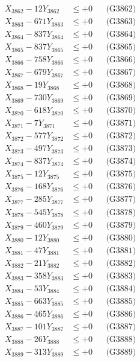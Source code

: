 \documentclass[a4paper,10pt]{article}
\begin{document}
{\begin{align}
X_{3862} - 12Y_{3862} &\leq +0 && \text{(G3862)} \\
X_{3863} - 671Y_{3863} &\leq +0 && \text{(G3863)} \\
X_{3864} - 837Y_{3864} &\leq +0 && \text{(G3864)} \\
X_{3865} - 837Y_{3865} &\leq +0 && \text{(G3865)} \\
X_{3866} - 758Y_{3866} &\leq +0 && \text{(G3866)} \\
X_{3867} - 679Y_{3867} &\leq +0 && \text{(G3867)} \\
X_{3868} - 19Y_{3868} &\leq +0 && \text{(G3868)} \\
X_{3869} - 730Y_{3869} &\leq +0 && \text{(G3869)} \\
X_{3870} - 618Y_{3870} &\leq +0 && \text{(G3870)} \\
\allowbreak
X_{3871} - 7Y_{3871} &\leq +0 && \text{(G3871)} \\
X_{3872} - 577Y_{3872} &\leq +0 && \text{(G3872)} \\
X_{3873} - 497Y_{3873} &\leq +0 && \text{(G3873)} \\
X_{3874} - 837Y_{3874} &\leq +0 && \text{(G3874)} \\
X_{3875} - 12Y_{3875} &\leq +0 && \text{(G3875)} \\
X_{3876} - 168Y_{3876} &\leq +0 && \text{(G3876)} \\
X_{3877} - 285Y_{3877} &\leq +0 && \text{(G3877)} \\
X_{3878} - 545Y_{3878} &\leq +0 && \text{(G3878)} \\
X_{3879} - 460Y_{3879} &\leq +0 && \text{(G3879)} \\
X_{3880} - 12Y_{3880} &\leq +0 && \text{(G3880)} \\
\allowbreak
X_{3881} - 47Y_{3881} &\leq +0 && \text{(G3881)} \\
X_{3882} - 21Y_{3882} &\leq +0 && \text{(G3882)} \\
X_{3883} - 358Y_{3883} &\leq +0 && \text{(G3883)} \\
X_{3884} - 53Y_{3884} &\leq +0 && \text{(G3884)} \\
X_{3885} - 663Y_{3885} &\leq +0 && \text{(G3885)} \\
X_{3886} - 465Y_{3886} &\leq +0 && \text{(G3886)} \\
X_{3887} - 101Y_{3887} &\leq +0 && \text{(G3887)} \\
X_{3888} - 26Y_{3888} &\leq +0 && \text{(G3888)} \\
X_{3889} - 313Y_{3889} &\leq +0 && \text{(G3889)} \\

\end{align}}
\end{document}
